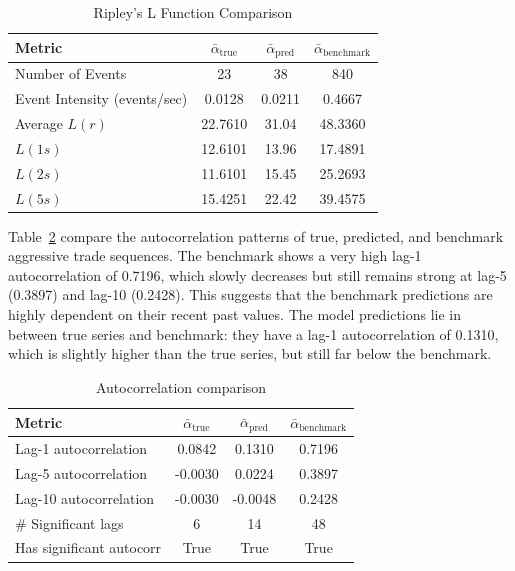 \begin{table}[H]
    \centering
    \caption{Ripley's L Function Comparison} 
    \begin{tabular}{lccc}
    \toprule
    \textbf{Metric} & $\bar{\alpha}_\text{true}$ & $\bar{\alpha}_\text{pred}$ & $\bar{\alpha}_\text{benchmark}$ \\
    \midrule
    Number of Events & 23 & 38 & 840 \\
    Event Intensity (events/sec) & 0.0128 & 0.0211 & 0.4667 \\
    Average \( L(r) \) & 22.7610 & 31.04 & 48.3360 \\
    \( L(1s) \) & 12.6101 & 13.96 & 17.4891\\
    \( L(2s) \) & 11.6101 & 15.45 & 25.2693\\
    \( L(5s) \) & 15.4251 & 22.42 & 39.4575\\
    \bottomrule
    \end{tabular}
    \label{tb:ripley-l_com}
\end{table}

Table~\ref{tab:acf-series-com} compare the autocorrelation patterns of true, predicted, and benchmark aggressive trade sequences. The benchmark shows a very high lag-1 autocorrelation of 0.7196, which slowly decreases but still remains strong at lag-5 (0.3897) and lag-10 (0.2428). This suggests that the benchmark predictions are highly dependent on their recent past values. The model predictions lie in between true series and benchmark: they have a lag-1 autocorrelation of 0.1310, which is slightly higher than the true series, but still far below the benchmark. 

\begin{table}[htbp]
\centering
\caption{Autocorrelation comparison}
\begin{tabular}{lccc}
\toprule
\textbf{Metric} & $\bar{\alpha}_{\text{true}}$ & $\bar{\alpha}_{\text{pred}}$ & $\bar{\alpha}_{\text{benchmark}}$ \\
\midrule
Lag-1 autocorrelation       & 0.0842  & 0.1310  & 0.7196  \\
Lag-5 autocorrelation       & -0.0030 & 0.0224  & 0.3897  \\
Lag-10 autocorrelation      & -0.0030 & -0.0048 & 0.2428  \\
\# Significant lags         & 6       & 14      & 48      \\
Has significant autocorr    & True    & True    & True    \\
\bottomrule
\end{tabular}
\label{tab:acf-series-com}
\end{table}


